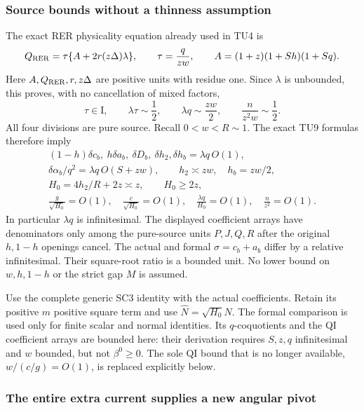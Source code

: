 \subsubsection*{Source bounds without a thinness assumption}

The exact RER physicality equation already used in TU4 is
\[
 Q_{\rm RER}=\tau\{A+2r(z\Delta)\lambda\},\qquad
 \tau=\frac q{zw},\qquad
 A=(1+z)(1+Sh)(1+Sq).
\]
Here $A,Q_{\rm RER},r,z\Delta$ are positive units with residue one.
Since $\lambda$ is unbounded, this proves, with no cancellation of
mixed factors,
\[
 \tau\in\mathrm I,\qquad \lambda\tau\sim\frac12,\qquad
 \lambda q\sim\frac{zw}{2},\qquad
 \frac n{z^2w}\sim\frac12.                                     \tag{UL2}
\]
All four divisions are pure source. Recall $0<w<R\sim1$.
The exact TU9 formulas therefore imply
\[
\begin{gathered}
 (1-h)\delta c_b,\ h\delta a_b,\ \delta D_b,\
            \delta h_2,\delta h_b=\lambda q\,O(1),\\
 \delta\alpha_b/q^2=\lambda q\,O(S+zw),\qquad
 h_2\asymp zw,\quad h_b=zw/2,\\
 H_0=4h_2/R+2z\asymp z,\qquad H_0\geq2z,\\
 \frac g{\sqrt{H_0}}=O(1),\quad
 \frac c{\sqrt{H_0}}=O(1),\quad
 \frac{\lambda q}{H_0}=O(1),\quad \frac n{z^2}=O(1).
\end{gathered}                                                   \tag{UL3}
\]
In particular $\lambda q$ is infinitesimal. The displayed coefficient
arrays have denominators only among the pure-source units
$P,J,Q,R$ after the original $h,1-h$ openings cancel.
The actual and formal $\sigma=c_b+a_b$ differ by a relative
infinitesimal. Their square-root ratio is a bounded unit.
No lower bound on $w,h,1-h$ or the strict gap $M$ is assumed.

Use the complete generic SC3 identity with the actual coefficients.
Retain its positive $m$ positive square term and use $\widehat N=\sqrt{H_0}N$.
The formal comparison is used only for finite scalar and normal
identities. Its $q$-coquotients and the QI coefficient arrays are
bounded here: their derivation requires $S,z,q$ infinitesimal and
$w$ bounded, but not $\beta^0\geq0$. The sole QI bound that is no
longer available, $w/(c/g)=O(1)$, is replaced explicitly below.

\subsubsection*{The entire extra current supplies a new angular pivot}

